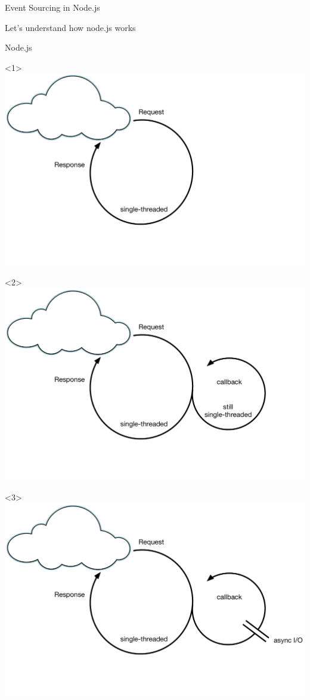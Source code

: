 \begin{frame}[fragile]{Event Sourcing in Node.js}

Let's understand how node.js works

\end{frame}

\begin{frame}[fragile]{Node.js}

\begin{onlyenv}<1>
\includegraphics[width=.7\textwidth]{../Nodejs1.pdf}
\end{onlyenv}

\begin{onlyenv}<2>
\includegraphics[width=.7\textwidth]{../Nodejs2.pdf}
\end{onlyenv}

\begin{onlyenv}<3>
\includegraphics[width=.7\textwidth]{../Nodejs3.pdf}
\end{onlyenv}


\end{frame}
